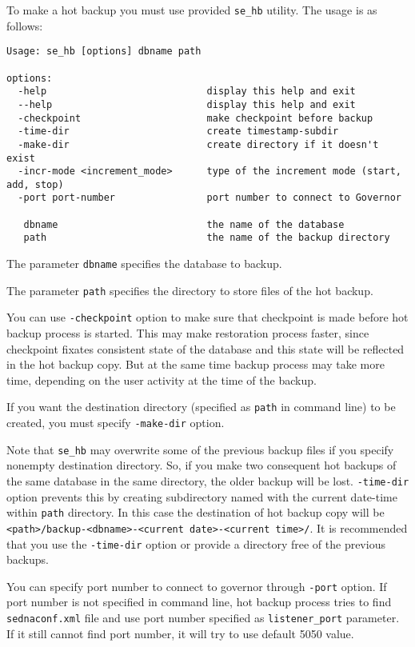\documentclass[a4paper,12pt]{article}
\begin{document}
To make a hot backup you must use provided \verb!se_hb! utility. The usage is as follows:
\begin{verbatim}
Usage: se_hb [options] dbname path

options:
  -help                            display this help and exit
  --help                           display this help and exit
  -checkpoint                      make checkpoint before backup
  -time-dir                        create timestamp-subdir
  -make-dir                        create directory if it doesn't exist
  -incr-mode <increment_mode>      type of the increment mode (start, add, stop)
  -port port-number                port number to connect to Governor

   dbname                          the name of the database
   path                            the name of the backup directory
\end{verbatim}

The parameter \verb!dbname! specifies the database to backup.

The parameter \verb!path! specifies the directory to store files of the hot backup.

You can use \verb!-checkpoint! option to make sure that checkpoint is made before hot backup process is started. This
may make restoration process faster, since checkpoint fixates consistent state of the database and this state will be reflected
in the hot backup copy. But at the same time backup process may take more time, depending on the user activity at the time
of the backup.

If you want the destination directory (specified as \verb!path! in command line) to be created, you must specify
\verb!-make-dir! option.

Note that \verb!se_hb! may overwrite some of the
previous backup files if you specify nonempty destination directory. So, if you make two consequent hot backups of the same
database in the same directory, the older backup will be lost. \verb!-time-dir! option prevents this by creating
subdirectory named with the current date-time within \verb!path! directory. In this case the destination of hot backup copy
will be \verb!<path>/backup-<dbname>-<current date>-<current time>/!. It is recommended that you use the \verb!-time-dir!
option or provide a directory free of the previous backups.

You can specify port number to connect to governor through \verb!-port! option. If port number is not specified in command line,
hot backup process tries to find \verb!sednaconf.xml! file and use port number specified as \verb!listener_port! parameter.
If it still cannot find port number, it will try to use default 5050 value.
\end{document}
